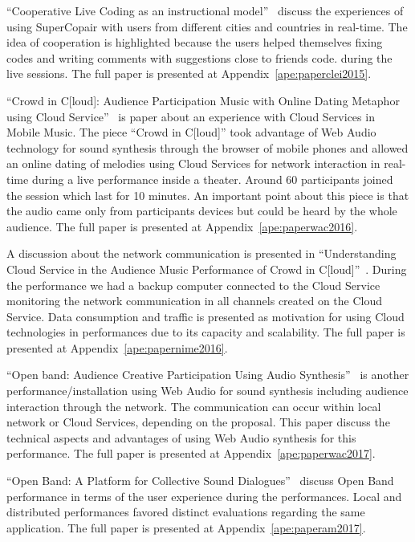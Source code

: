 ``Cooperative Live Coding as an instructional model''~\citep{deCarvalhoJunior2015cooperative} discuss the experiences of using SuperCopair with users from different cities and countries in real-time.
The idea of cooperation is highlighted because the users helped themselves fixing codes and writing comments with suggestions close to friends code. during the live sessions.
The full paper is presented at Appendix~\ref{ape:paperclei2015}.

``Crowd in C[loud]: Audience Participation Music with Online Dating Metaphor using Cloud Service''~\citep{Lee2016crowd} is paper about an experience with Cloud Services in Mobile Music.
The piece ``Crowd in C[loud]'' took advantage of Web Audio technology for sound synthesis through the browser of mobile phones and allowed an online dating of melodies using Cloud Services for network interaction in real-time during a live performance inside a theater.
Around 60 participants joined the session which last for 10 minutes.
An important point about this piece is that the audio came only from participants devices but could be heard by the whole audience.
The full paper is presented at Appendix~\ref{ape:paperwac2016}.

A discussion about the network communication is presented in ``Understanding Cloud Service in the Audience Music Performance of Crowd in C[loud]''~\citep{deCarvalhoJunior2016understanding}.
During the performance we had a backup computer connected to the Cloud Service monitoring the network communication in all channels created on the Cloud Service.
Data consumption and traffic is presented as motivation for using Cloud technologies in performances due to its capacity and scalability.
The full paper is presented at Appendix~\ref{ape:papernime2016}.

``Open band: Audience Creative Participation Using Audio Synthesis''~\citep{Stolfi2017openwac} is another performance/installation using Web Audio for sound synthesis including audience interaction through the network.
The communication can occur within local network or Cloud Services, depending on the proposal.
This paper discuss the technical aspects and advantages of using Web Audio synthesis for this performance.
The full paper is presented at Appendix~\ref{ape:paperwac2017}.

``Open Band: A Platform for Collective Sound Dialogues''~\citep{Stolfi2017openam} discuss Open Band performance in terms of the user experience during the performances.
Local and distributed performances favored distinct evaluations regarding the same application.
The full paper is presented at Appendix~\ref{ape:paperam2017}.

